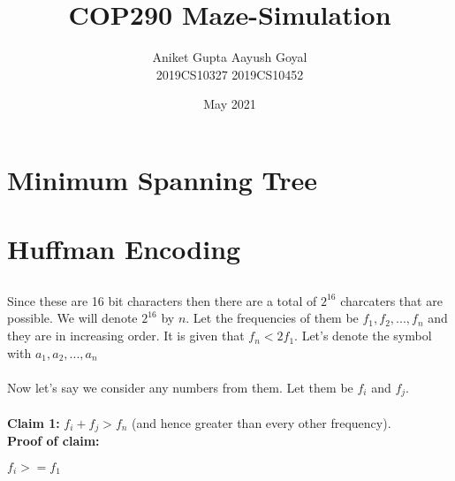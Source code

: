 \documentclass{article}
\title{COP290 Maze-Simulation}
\date{May 2021}
\author{Aniket Gupta \hspace{2cm}  Aayush Goyal \\
    2019CS10327 \hspace{2.3cm} 2019CS10452}
\begin{document}
\maketitle

\section{Minimum Spanning Tree}
\subsection{}

\subsection{}

\section{Huffman Encoding}
\subsection{}

\subsection{}

Since these are 16 bit characters then there are a total of $2^{16}$ charcaters that are possible. We will denote $2^{16}$ by $n$. Let the frequencies of them be $f_1, f_2, ... , f_n$ and they are in increasing order. It is given that $f_n < 2f_1$. Let's denote the symbol with $a_1, a_2, ... ,a_n$
\\\\
Now let's say we consider any numbers from them. Let them be $f_i$ and $f_j$. 
\\\\
\textbf{Claim 1:} $f_i+f_j > f_n$ (and hence greater than every other frequency).
\\ 
\textbf{Proof of claim:}

$f_i >= f_1$
\end{document}
